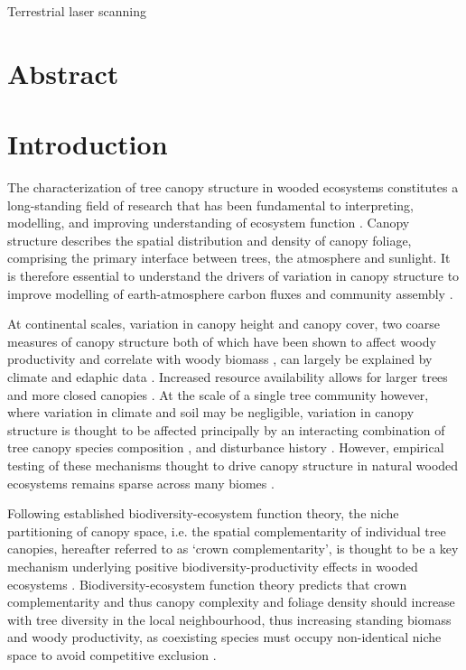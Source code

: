 \documentclass[11pt,a4paper]{article}
\newcommand{\titletext}{Terrestrial laser scanning}
\begin{document}
{\LARGE{\titletext{}}}

\linenumbers

\section*{Abstract}

\section{Introduction}

The characterization of tree canopy structure in wooded ecosystems constitutes a long-standing field of research that has been fundamental to interpreting, modelling, and improving understanding of ecosystem function \citep{Watt1947, Whittaker1969, Horn1971, Maarel1996}. Canopy structure describes the spatial distribution and density of canopy foliage, comprising the primary interface between trees, the atmosphere and sunlight. It is therefore essential to understand the drivers of variation in canopy structure to improve modelling of earth-atmosphere carbon fluxes and community assembly \citep{}. 

At continental scales, variation in canopy height and canopy cover, two coarse measures of canopy structure both of which have been shown to affect woody productivity and correlate with woody biomass \citep{}, can largely be explained by climate and edaphic data \citep{SOME-GEDI}. Increased resource availability allows for larger trees and more closed canopies \citep{}. At the scale of a single tree community however, where variation in climate and soil may be negligible, variation in canopy structure is thought to be affected principally by an interacting combination of tree canopy species composition \citep{}, and disturbance history \citep{}. However, empirical testing of these mechanisms thought to drive canopy structure in natural wooded ecosystems remains sparse across many biomes \citep{}.

Following established biodiversity-ecosystem function theory, the niche partitioning of canopy space, i.e. the spatial complementarity of individual tree canopies, hereafter referred to as `crown complementarity', is thought to be a key mechanism underlying positive biodiversity-productivity effects in wooded ecosystems \citep{Pretzsch2014, Barry2019}. Biodiversity-ecosystem function theory predicts that crown complementarity and thus canopy complexity and foliage density should increase with tree diversity in the local neighbourhood, thus increasing standing biomass and woody productivity, as coexisting species must occupy non-identical niche space to avoid competitive exclusion \citep{Gadow1993}. 
\end{document}
